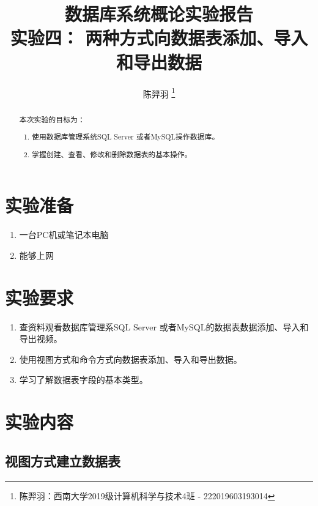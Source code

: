 \documentclass[a4paper,UTF8,heading=false,12pt]{article}
\newcommand\subtitle[1]{{\small #1}}
\begin{document}
    \title{
        数据库系统概论实验报告 \\
        \subtitle{实验四： 两种方式向数据表添加、导入和导出数据}
    }
    \author{陈羿羽 \thanks{陈羿羽：西南大学2019级计算机科学与技术4班 - 222019603193014}}
    \maketitle

    \begin{abstract}
        本次实验的目标为：
        \begin{enumerate}
            \item 使用数据库管理系统SQL Server 或者MySQL操作数据库。
            \item 掌握创建、查看、修改和删除数据表的基本操作。
        \end{enumerate}
    \end{abstract}

    \newpage

    \section{实验准备}

    \begin{enumerate}
        \item 一台PC机或笔记本电脑
        \item 能够上网
    \end{enumerate}

    \section{实验要求}

    \begin{enumerate}
        \item 查资料观看数据库管理系SQL Server 或者MySQL的数据表数据添加、导入和导出视频。
        \item 使用视图方式和命令方式向数据表添加、导入和导出数据。
        \item 学习了解数据表字段的基本类型。
    \end{enumerate}

    \section{实验内容}

    \subsection{视图方式建立数据表}
\end{document}
